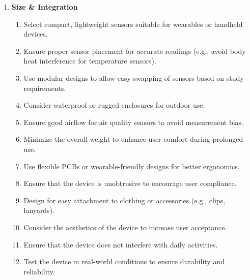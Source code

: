 \documentclass[12pt,a4paper]{article}
\begin{document}
\begin{enumerate}
    \item \textbf{Size \& Integration}
          \begin{enumerate}
              \item Select compact, lightweight sensors suitable for wearables or handheld devices.
              \item Ensure proper sensor placement for accurate readings (e.g., avoid body heat interference for temperature sensors).
              \item Use modular designs to allow easy swapping of sensors based on study requirements.
              \item Consider waterproof or rugged enclosures for outdoor use.
              \item Ensure good airflow for air quality sensors to avoid measurement bias.
              \item Minimize the overall weight to enhance user comfort during prolonged use.
              \item Use flexible PCBs or wearable-friendly designs for better ergonomics.
              \item Ensure that the device is unobtrusive to encourage user compliance.
              \item Design for easy attachment to clothing or accessories (e.g., clips, lanyards).
              \item Consider the aesthetics of the device to increase user acceptance.
              \item Ensure that the device does not interfere with daily activities.
              \item Test the device in real-world conditions to ensure durability and reliability.
          \end{enumerate}


\end{enumerate}
\end{document}
